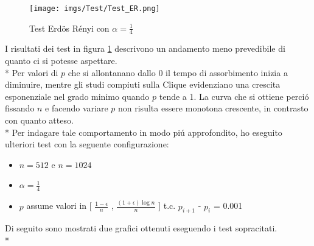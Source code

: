 \documentclass[../Tesi.tex]{subfiles}
\begin{document}
\begin{figure}[H]
    \centering
    \texttt{[image: imgs/Test/Test\_ER.png]}
    \caption{Test Erd{\"o}s R\'enyi con $\alpha = \frac{1}{4}$}
    \label{imh:TestER}
\end{figure}
I risultati dei test in figura \ref{imh:TestER} descrivono un andamento meno prevedibile di quanto ci si potesse aspettare.\\*
Per valori di $p$ che si allontanano dallo 0 il tempo di assorbimento inizia a diminuire, mentre gli studi compiuti sulla Clique \cite{DBLP:journals/corr/abs-2008-13589} evidenziano una crescita esponenziale nel grado minimo quando $p$ tende a 1. La curva che si ottiene perci\'o fissando $n$ e facendo variare $p$ non risulta essere monotona crescente, in contrasto con quanto atteso.\\*
Per indagare tale comportamento in modo pi\'u approfondito, ho eseguito ulteriori test con la seguente configurazione:
\begin{itemize}
    \item $n=512$ e $n=1024$
    \item $\alpha=\frac{1}{4}$
    \item $p$ assume valori in [ $\frac{1-\epsilon}{n}$ , $\frac{{(1+\epsilon)}\log{}n}{n}$ ] t.c. $p_{i+1}$ - $p_{i}$ = 0.001
\end{itemize}
Di seguito sono mostrati due grafici ottenuti eseguendo i test sopracitati.\\*
\end{document}
